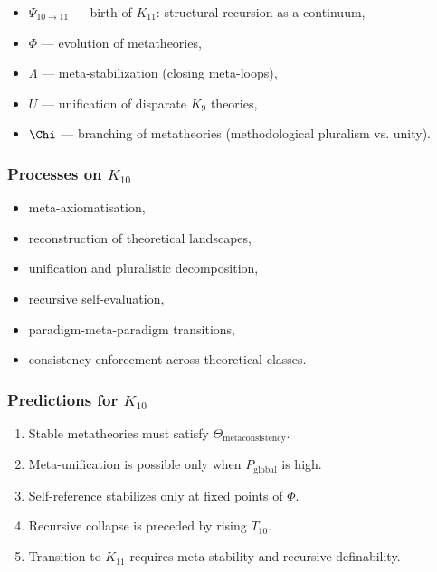 \begin{itemize}
    \item $\Psi_{10\to11}$ — birth of $K_{11}$: structural recursion as a continuum,
    \item $\Phi$ — evolution of metatheories,
    \item $\Lambda$ — meta-stabilization (closing meta-loops),
    \item $U$ — unification of disparate $K_9$ theories,
    \item $\Chi$ — branching of metatheories (methodological pluralism vs. unity).
\end{itemize}

\subsubsection{Processes on $K_{10}$}

\begin{itemize}
    \item meta-axiomatisation,
    \item reconstruction of theoretical landscapes,
    \item unification and pluralistic decomposition,
    \item recursive self-evaluation,
    \item paradigm-meta-paradigm transitions,
    \item consistency enforcement across theoretical classes.
\end{itemize}

\subsubsection{Predictions for $K_{10}$}

\begin{enumerate}
    \item Stable metatheories must satisfy $\Theta_{\mathrm{metaconsistency}}$.
    \item Meta-unification is possible only when $P_{\mathrm{global}}$ is high.
    \item Self-reference stabilizes only at fixed points of $\Phi$.
    \item Recursive collapse is preceded by rising $T_{10}$.
    \item Transition to $K_{11}$ requires meta-stability and recursive definability.
\end{enumerate}

